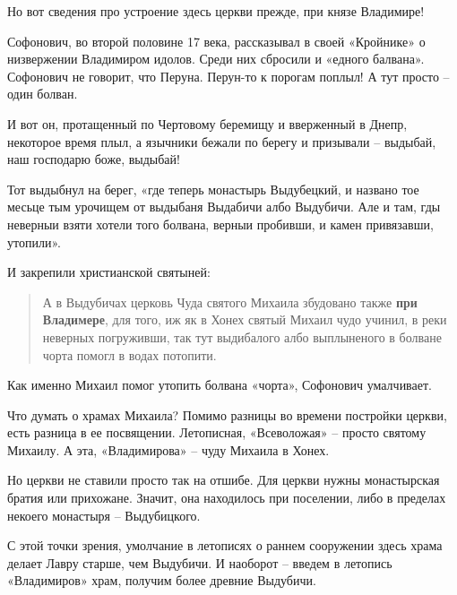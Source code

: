 Но вот сведения про устроение здесь церкви прежде, при князе Владимире!

Софонович, во второй половине 17 века, рассказывал в своей «Кройнике» о низвержении Владимиром идолов. Среди них сбросили и «едного балвана». Софонович не говорит, что Перуна. Перун-то к порогам поплыл! А тут просто – один болван.

И вот он, протащенный по Чертовому беремищу и вверженный в Днепр, некоторое время плыл, а язычники бежали по берегу и призывали – выдыбай, наш господарю боже, выдыбай!

Тот выдыбнул на берег, «где теперь монастырь Выдубецкий, и названо тое месьце тым урочищем от выдыбаня Выдабичи албо Выдубичи. Але и там, гды неверныи взяти хотели того болвана, верныи пробивши, и камен привязавши, утопили». 

И закрепили христианской святыней:

\begin{quotation} 
А в Выдубичах церковь Чуда святого Михаила збудовано также \textbf{при Владимере}, для того, иж як в Хонех святый Михаил чудо учинил, в реки неверных погруживши, так тут выдибалого албо выплыненого в болване чорта помогл в водах потопити.
\end{quotation} 

Как именно Михаил помог утопить болвана «чорта», Софонович умалчивает. 



Что думать о храмах Михаила? Помимо разницы во времени постройки церкви, есть разница в ее посвящении. Летописная, «Всеволожая» – просто святому Михаилу. А эта, «Владимирова» – чуду Михаила в Хонех.

Но церкви не ставили просто так на отшибе. Для церкви нужны монастырская братия или прихожане. Значит, она находилось при поселении, либо в пределах некоего монастыря – Выдубицкого.

С этой точки зрения, умолчание в летописях о раннем сооружении здесь храма делает Лавру старше, чем Выдубичи. И наоборот – введем в летопись «Владимиров» храм, получим более древние Выдубичи.

